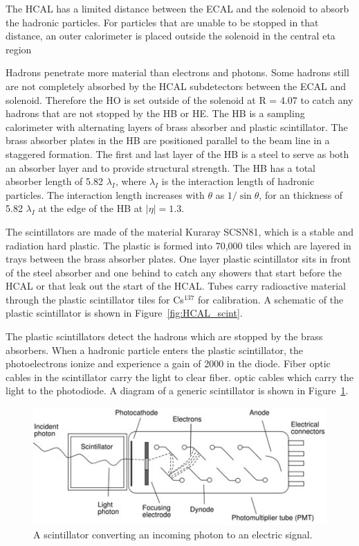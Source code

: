 The HCAL has a limited distance between the ECAL and the solenoid to absorb the hadronic particles. For particles that are unable to be stopped in that distance, an outer calorimeter is placed outside the solenoid in the central eta region



Hadrons penetrate more material than electrons and photons. Some hadrons still are not completely absorbed by the HCAL subdetectors between the ECAL and solenoid. Therefore the HO is set outside of the solenoid at R = 4.07 to catch any hadrons that are not stopped by the HB or HE. The HB is a sampling calorimeter with alternating layers of brass absorber and plastic scintillator. The brass absorber plates in the HB are positioned parallel to the beam line in a staggered formation. The first and last layer of the HB is a steel to serve as both an absorber layer and to provide structural strength. The HB has a total absorber length of 5.82 $\lambda_I$, where $\lambda_I$ is the interaction length of hadronic particles. The interaction length increases with $\theta$ as $1/\sin{\theta}$, for an thickness of 5.82 $\lambda_I$ at the edge of the HB at $|\eta| = 1.3$.

The scintillators are made of the material Kuraray SCSN81, which is a stable and radiation hard plastic. The plastic is formed into 70,000 tiles which are layered in trays between the brass absorber plates. One layer plastic scintillator sits in front of the steel absorber and one behind to catch any showers that start before the HCAL or that leak out the start of the HCAL. Tubes carry radioactive material through the plastic scintillator tiles for Cs$^{137}$ for calibration. A schematic of the plastic scintillator is shown in Figure~\ref{fig:HCAL_scint}.

The plastic scintillators detect the hadrons which are stopped by the brass absorbers. When a hadronic particle enters the plastic scintillator, the photoelectrons ionize and experience a gain of 2000 in the diode. Fiber optic cables in the scintillator carry the light to clear fiber. optic cables which carry the light to the photodiode. A diagram of a generic scintillator is shown in Figure~\ref{fig:scintillator}.

\begin{figure}[h]
\centering
\includegraphics[width=1.0\textwidth]{figures/scintillator.jpg}
\caption{A scintillator converting an incoming photon to an electric signal.}
\label{fig:scintillator}
\end{figure}

